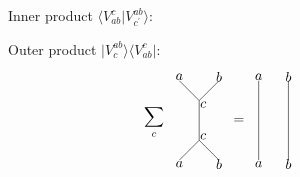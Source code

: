 \documentclass{article}
\begin{document}
\begin{figure}[ht]
  \centering
    \begin{minipage}{0.45\textwidth}
      \centering
      \color{blue}
      \footnotesize{Inner product $\langle V^{c}_{ab} \vert V_{c^\prime}^{ab} \rangle$:}\\
      \color{black}
    \end{minipage}
    \hfill
    \begin{minipage}{0.45\textwidth}
      \centering
      \color{blue}
      \footnotesize{Outer product $\vert V^{ab}_c \rangle \langle V^{c}_{ab} \vert$:}
      \color{black}
      \begin{equation*}
        \sum_{c} 
        \raisebox{-38pt}{
        \begin{tikzpicture}
          \node at (0.0, 2.1) {$a$};
          \node at (1.0, 2.1) {$b$};
          \draw [-] plot coordinates {(1.0, 2.0) (0.5, 1.5)};
          \draw [-] plot coordinates {(0.0, 2.0) (0.5, 1.5)};
          \draw [-] plot coordinates {(0.5, 1.5) (0.5, 0.5)};
          \node at (0.0, -0.1) {$a$};
          \node at (1.0, -0.1) {$b$};
          \node at (0.6, 1.4) {$c$};
          \draw [-] plot coordinates {(0.5, 0.5) (1.0, 0.0)};
          \draw [-] plot coordinates {(0.5, 0.5) (0.0, 0.0)};
          \node at (0.6, 0.6) {$c$};
          \node at (1.5,1.0) {$=$};
          \node at (2.0, 2.1) {$a$};
          \node at (2.75, 2.1) {$b$};
          \draw [-] plot coordinates {(2.0,2.0) (2.0,0.0)};
          \draw [-] plot coordinates {(2.75,2.0) (2.75, 0.0)};
          \node at (2.0, -0.1) {$a$};
          \node at (2.75, -0.1) {$b$};
        \end{tikzpicture}}
      \end{equation*}
     
    \end{minipage}
\end{figure}
\vspace{0.5cm}
\end{document}
